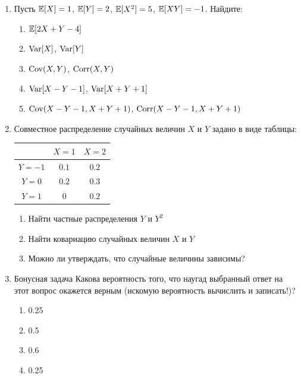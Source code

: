 \documentclass[12pt, a4paper]{article}\usepackage[]{graphicx}\usepackage[]{color}
\begin{document}
\begin{enumerate}
\item Пусть $\mathbb{E} [X] = 1$, $\mathbb{E} [Y] = 2$, $\mathbb{E} [X^2] = 5$, $\mathbb{E}[XY] = -1$. Найдите:
\begin{enumerate}
\item $\mathbb{E} [2X + Y - 4]$
\item $\operatorname{Var}[X]$, $\operatorname{Var}[Y]$
\item $\operatorname{Cov}(X,Y)$, $\operatorname{Corr}(X,Y)$
\item $\operatorname{Var}[X-Y-1]$,  $\operatorname{Var}[X+Y+1]$
\item $\operatorname{Cov}(X-Y-1, X+Y+1)$,  $\operatorname{Corr}(X-Y-1, X+Y+1)$
\end{enumerate}

\item Совместное распределение случайных величин $X$ и $Y$ задано в виде таблицы:

\begin{table}
\begin{tabular}{|c|c|c|}
\hline
 & $X=1$ & $X=2$ \\ \hline
$Y=-1$ & $0.1$ & $0.2$ \\ \hline
$Y=0$ & $0.2$ & $0.3$ \\ \hline
$Y=1$ & $0$ & $0.2$ \\ \hline
\end{tabular}
\end{table}

\begin{enumerate}
\item Найти частные распределения $Y$ и $Y^2$
\item Найти ковариацию случайных величин $X$ и $Y$
\item Можно ли утверждать, что случайные величины зависимы?
\end{enumerate}

\item{Бонусная задача}
Какова вероятность того, что наугад выбранный ответ на этот вопрос окажется верным (искомую вероятность вычислить и записать!)?
\begin{enumerate}
\item 0.25
\item 0.5
\item 0.6
\item 0.25
\end{enumerate}

\end{enumerate}
\end{document}
